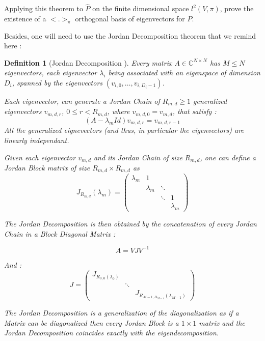 \documentclass[sn-mathphys]{sn-jnl}%
\theoremstyle{thmstyleone}%
\theoremstyle{thmstyletwo}%
\theoremstyle{thmstylethree}%
\newtheorem{definition}[theo]{Definition}
\begin{document}
Applying this theorem to $\hat{P}$ on the finite dimensional space
$l^2(V, \pi)$, prove the existence of a $<.>_{\pi}$ orthogonal basis
of eigenvectors for $\hat{P}$.

Besides, one will need to use the Jordan Decomposition theorem that we
remind here :

\begin{definition}[Jordan Decomposition \cite{sandryhaila_moura_2014}]\label{def:Jordan_decomposition}
  Every matrix $A \in \mathbb{C}^{N \times N}$ has $M \leq N$
  eigenvectors, each eigenvector $\lambda_i$ being associated with an
  eigenspace of dimension $D_i$, spanned by the eigenvectors
  $(v_{i,0}, \hdots, v_{i, D_i - 1})$.

  Each eigenvector, can generate a \textit{Jordan Chain} of
  $R_{m,d} \geq 1$ \textit{generalized eigenvectors} $v_{m,d,r}$,
  $0 \leq r < R_{m,d}$, where $v_{m,d,0} = v_{m,d}$, that satisfy :
\begin{equation}\label{eq:generalized_eigenvector_equation}
    (A - \lambda_m Id)v_{m,d,r} = v_{m,d,r-1}
\end{equation}
All the generalized eignevectors (and thus, in particular the
eigenvectors) are linearly independant.

Given each eigenvector $v_{m,d}$ and its Jordan Chain of size
$R_{m,d}$, one can define a \textit{Jordan Block} matrix of size
$R_{m,d} \times R_{m,d}$ as
\begin{equation}
    J_{R_{m,d}}(\lambda_m) = \begin{pmatrix} \lambda_m & 1 & & \\ & \lambda_m & \ddots & \\ & & \ddots & 1   \\ & & & \lambda_m   \end{pmatrix}
\end{equation}

The Jordan Decomposition is then obtained by the concatenation of
every Jordan Chain in a Block Diagonal Matrix :

\begin{equation}
    A = VJV^{-1}
\end{equation}

And :
\begin{equation}
    J = \begin{pmatrix} J_{R_{0,0}(\lambda_0)} & & \\
& \ddots & \\ & & J_{R_{M-1, D_{M-1}}(\lambda_{M-1})} \end{pmatrix}
\end{equation}

The Jordan Decomposition is a generalization of the diagonalization as
if a Matrix can be diagonalized then every Jordan Block is a
$1\times1$ matrix and the Jordan Decomposition coincides exactly with
the eigendecomposition.

\end{definition}
\end{document}
